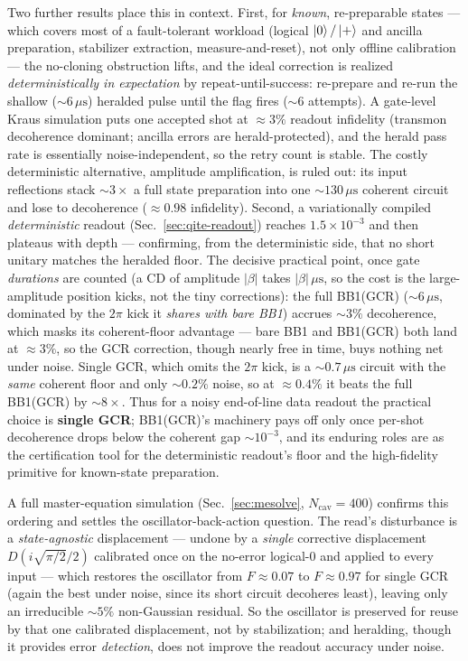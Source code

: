 \documentclass[11pt]{article}
\begin{document}
Two further results place this in context. First, for \emph{known}, re-preparable states --- which
covers most of a fault-tolerant workload (logical $\ket{0}/\ket{+}$ and ancilla preparation, stabilizer
extraction, measure-and-reset), not only offline calibration --- the no-cloning obstruction lifts, and
the ideal correction is realized \emph{deterministically in expectation} by repeat-until-success:
re-prepare and re-run the shallow ($\sim\!6\,\mu\mathrm{s}$) heralded pulse until the flag fires
($\sim\!6$ attempts). A gate-level Kraus simulation puts one accepted shot at $\approx3\%$ readout
infidelity (transmon decoherence dominant; ancilla errors are herald-protected), and the herald pass
rate is essentially noise-independent, so the retry count is stable. The costly deterministic
alternative, amplitude amplification, is ruled out: its input reflections stack $\sim\!3\times$ a full
state preparation into one $\sim\!130\,\mu\mathrm{s}$ coherent circuit and lose to decoherence
($\approx0.98$ infidelity). Second, a variationally compiled \emph{deterministic} readout
(Sec.~\ref{sec:qite-readout}) reaches $1.5\times10^{-3}$ and then plateaus with depth --- confirming,
from the deterministic side, that no short unitary matches the heralded floor. The decisive practical
point, once gate \emph{durations} are counted (a CD of amplitude $|\beta|$ takes $|\beta|\,\mu\mathrm{s}$,
so the cost is the large-amplitude position kicks, not the tiny corrections): the full BB1(GCR)
($\sim\!6\,\mu\mathrm{s}$, dominated by the $2\pi$ kick it \emph{shares with bare BB1}) accrues
$\sim\!3\%$ decoherence, which masks its coherent-floor advantage --- bare BB1 and BB1(GCR) both land at
$\approx3\%$, so the GCR correction, though nearly free in time, buys nothing net under noise. Single
GCR, which omits the $2\pi$ kick, is a $\sim\!0.7\,\mu\mathrm{s}$ circuit with the \emph{same} coherent
floor and only $\sim\!0.2\%$ noise, so at $\approx0.4\%$ it beats the full BB1(GCR) by $\sim\!8\times$.
Thus for a noisy end-of-line data readout the practical choice is \textbf{single GCR}; BB1(GCR)'s
machinery pays off only once per-shot decoherence drops below the coherent gap $\sim\!10^{-3}$, and its
enduring roles are as the certification tool for the deterministic readout's floor and the high-fidelity
primitive for known-state preparation.

A full master-equation simulation (Sec.~\ref{sec:mesolve}, $N_{\mathrm{cav}}=400$) confirms this
ordering and settles the oscillator-back-action question. The read's disturbance is a
\emph{state-agnostic} displacement --- undone by a \emph{single} corrective displacement
$D(i\sqrt{\pi/2}/2)$ calibrated once on the no-error logical-$0$ and applied to every input --- which
restores the oscillator from $F\approx0.07$ to $F\approx0.97$ for single GCR (again the best under
noise, since its short circuit decoheres least), leaving only an irreducible $\sim\!5\%$ non-Gaussian
residual. So the oscillator is preserved for reuse by that one calibrated displacement, not by
stabilization; and heralding, though it provides error \emph{detection}, does not improve the readout
accuracy under noise.
\end{document}
